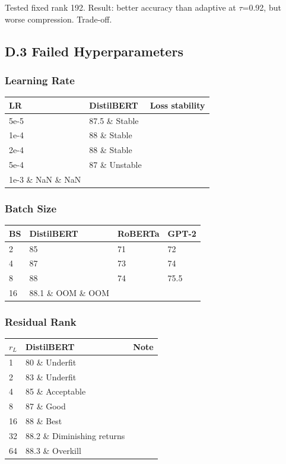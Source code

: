 Tested fixed rank 192. Result: better accuracy than adaptive at $\tau$=0.92, 
but worse compression. Trade-off.

\subsection{D.3 Failed Hyperparameters}

\subsubsection{Learning Rate}

\begin{table}[H]
\centering
\small
\begin{tabular}{lll}
\toprule
\textbf{LR} & \textbf{DistilBERT} & \textbf{Loss stability} \\
\midrule
5e-5 & 87.5 \& Stable \\
1e-4 & 88 \& Stable \\
2e-4 & 88 \& Stable \\
5e-4 & 87 \& Unstable \\
1e-3 \& NaN \& NaN \\
\bottomrule
\end{tabular}
\end{table}

\subsubsection{Batch Size}

\begin{table}[H]
\centering
\small
\begin{tabular}{llll}
\toprule
\textbf{BS} & \textbf{DistilBERT} & \textbf{RoBERTa} & \textbf{GPT-2} \\
\midrule
2 & 85 & 71 & 72 \\
4 & 87 & 73 & 74 \\
8 & 88 & 74 & 75.5 \\
16 & 88.1 \& OOM \& OOM \\
\bottomrule
\end{tabular}
\end{table}

\subsubsection{Residual Rank}

\begin{table}[H]
\centering
\small
\begin{tabular}{lll}
\toprule
\textbf{$r_L$} & \textbf{DistilBERT} & \textbf{Note} \\
\midrule
1 & 80 \& Underfit \\
2 & 83 \& Underfit \\
4 & 85 \& Acceptable \\
8 & 87 \& Good \\
16 & 88 \& Best \\
32 & 88.2 \& Diminishing returns \\
64 & 88.3 \& Overkill \\
\bottomrule
\end{tabular}
\end{table}

